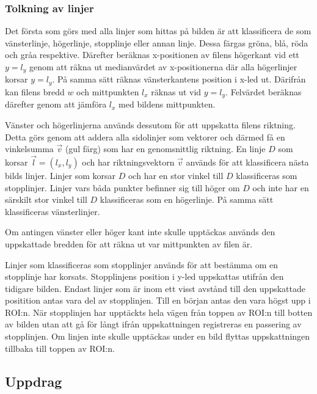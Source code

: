 \documentclass[tekniskrapport/tech.tex]{subfiles}
\begin{document}
\subsubsection{Tolkning av linjer}
Det första som görs med alla linjer som hittas på bilden är att klassificera de
som vänsterlinje, högerlinje, stopplinje eller annan linje. Dessa färgas gröna,
blå, röda och gråa respektive. Därefter beräknas x-positionen av filens
högerkant vid ett $y=l_y$ genom att räkna ut medianvärdet av x-positionerna där
alla högerlinjer korsar $y=l_y$. På samma sätt räknas vänsterkantens position i
x-led ut. Därifrån kan filens bredd $w$ och mittpunkten $l_x$ räknas ut vid
$y=l_y$. Felvärdet beräknas därefter genom att jämföra $l_x$ med bildens
mittpunkten.

Vänster och högerlinjerna används dessutom för att uppskatta filens riktning.
Detta görs genom att addera alla sidolinjer som vektorer och därmed få en
vinkelsumma $\vec{v}$ (gul färg) som har en genomsnittlig riktning. En linje
$D$ som korsar $\vec{l}=(l_x, l_y)$ och har riktningsvektorn $\vec{v}$ används
för att klassificera nästa bilds linjer. Linjer som korsar $D$ och har en stor
vinkel till $D$ klassificeras som stopplinjer. Linjer vars båda punkter
befinner sig till höger om $D$ och inte har en särskilt stor vinkel till $D$
klassificeras som en högerlinje. På samma sätt klassificeras vänsterlinjer.

Om antingen vänster eller höger kant inte skulle upptäckas används den
uppskattade bredden för att räkna ut var mittpunkten av filen är.

Linjer som klassificeras som stopplinjer används för att bestämma om en
stopplinje har korsats. Stopplinjens position i y-led uppskattas utifrån den
tidigare bilden. Endast linjer som är inom ett visst avstånd till den
uppskattade positition antas vara del av stopplinjen. Till en början antas den
vara högst upp i ROI:n. När stopplinjen har upptäckts hela vägen från toppen av
ROI:n till botten av bilden utan att gå för långt ifrån uppskattningen
registreras en passering av stopplinjen. Om linjen inte skulle upptäckas under
en bild flyttas uppskattningen tillbaka till toppen av ROI:n.

\subsection{Uppdrag} \label{sec:comm-mission}
\end{document}
